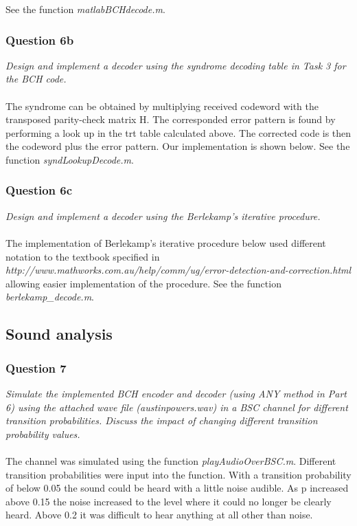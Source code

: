 \documentclass[a4paper]{article}
\begin{document}
See the function \textit{matlabBCHdecode.m}.

\subsubsection{Question 6b} \textit{Design and implement a decoder using the syndrome decoding table in Task 3 for the BCH code.}\\
\\
The syndrome can be obtained by multiplying received codeword with the transposed parity-check matrix H. The corresponded error pattern is found by performing a look up in the trt table calculated above. The corrected code is then the codeword plus the error pattern. Our implementation is shown below. See the function \textit{syndLookupDecode.m}.

\subsubsection{Question 6c} \textit{Design and implement a decoder using the Berlekamp’s iterative procedure.}\\
\\
The implementation of Berlekamp's iterative procedure below used different notation to the textbook specified in \textit{http://www.mathworks.com.au/help/comm/ug/error-detection-and-correction.html} allowing easier implementation of the procedure. See the function \textit{berlekamp\_decode.m}.

\subsection{Sound analysis}

\subsubsection{Question 7} \textit{Simulate the implemented BCH encoder and decoder (using ANY method in Part 6) using the attached wave file (austinpowers.wav) in a BSC channel for different transition probabilities. Discuss the impact of changing different transition probability values.}\\
\\
The channel was simulated using the function \textit{playAudioOverBSC.m}. Different transition probabilities were input into the function. With a transition probability of below 0.05 the sound could be heard with a little noise audible. As p increased above 0.15 the noise increased to the level where it could no longer be clearly heard. Above 0.2 it was difficult to hear anything at all other than noise.
\end{document}
